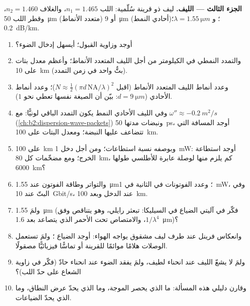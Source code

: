 \begin{problem}
\medskip
\noindent\textbf{الجزء الثالث --- الليف.}
ليف ذو قرينة سُلّمية: اللب $n_1 = 1.465$، والغلاف $n_2 = 1.460$، وقطر اللب
\qty{50}{\micro m} (متعدد الأنماط) أو \qty{9}{\micro m} (أحادي النمط)؛
و $\lambda = \qty{1.55}{\micro m}$؛  \qty{0.2}{dB/km}.
\begin{enumerate}[resume]
  \item أوجد  وزاوية القبول؛ أيسهل إدخال
        الضوء؟
  \item والتمدد النمطي في الكيلومتر من أجل الليف المتعدد الأنماط؛ وأعظم
        معدل بتات على \qty{10}{km} (بتٌّ واحد في زمن التمدد).
  \item وعدد أنماط الليف المتعدد الأنماط (اقبل $N \approx
        \tfrac12(\pi d\,\mathrm{NA}/\lambda)^2$)؛ وعدد أنماط الأحادي ($d =
        \qty{9}{\micro m}$: بيّن أن الصيغة نفسها تعطي نحو $1$).
  \item وفي الليف الأحادي النمط يكون التمدد الباقي لونيًّا:
        مع $\omega'' \approx \qty{-0.2}{m^2/s}$ (\cref{ch:b2:dispersion-wave-packets})
        ونبضات مدتها \qty{50}{ps}، أوجد المسافة التي تتضاعف عليها النبضة؛
        ومعدل البتات على \qty{100}{km}.
  \item {} على \qty{100}{km}  وبوصفه نسبة استطاعات؛ ومن أجل دخل
        \qty{1}{mW}: أوجد استطاعة الخرج؛ ومع مضخّمات كل \qty{80}{km}، كم
        يلزم منها لوصلة عابرة للأطلسي طولها \qty{6000}{km}؟
  \item والتواتر وطاقة الفوتون عند \qty{1.55}{\micro m}؛ وعدد الفوتونات في
        الثانية في \qty{1}{mW}، وفي البتّ عند \qty{10}{Gbit/s}، عند الدخل
        وبعد \qty{100}{km}.
  \item ولمَ \qty{1.55}{\micro m} (فكّر في آليتي الضياع في
        السيليكا: تبعثر رايلي، وهو يتناقص وفق $1/\lambda^4$، والامتصاص تحت
        الأحمر الذي يتصاعد بعد \qty{1.6}{\micro m})؟
  \item وانعكاس فرينل عند طرف ليف مشقوق يواجه الهواء: أوجد الضياع
        ؛ ولمَ تستعمل الوصلات هلامًا موائمًا للقرينة أو تماسًّا
        فيزيائيًّا مصقولًا.
  \item ولمَ لا يشعّ الليف عند انحناء لطيف، ولمَ يفقد الضوء
        عند انحناء حادّ (فكّر في زاوية الشعاع
        على حدّ اللب)؟
  \item وقارن دليلي هذه المسألة: ما الذي يحصر الموجة،
        وما الذي يحدّ عرض النطاق، وما الذي يحدّ الضياعات.
\end{enumerate}
\end{problem}
